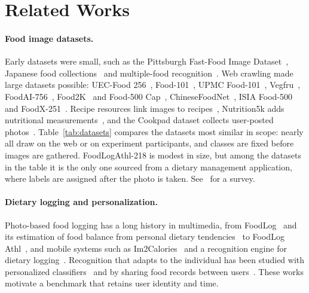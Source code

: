 \documentclass[sigconf, nonacm]{acmart}
\begin{document}
\section{Related Works}
\paragraph{Food image datasets.} Early datasets were small, such as the Pittsburgh Fast-Food Image Dataset~\cite{chen2009pfid}, Japanese food collections~\cite{joutou2009food,hoashi2010image} and multiple-food recognition~\cite{matsuda2012multiple}. Web crawling made large datasets possible: UEC-Food 256~\cite{kawano2015automatic}, Food-101~\cite{bossard2014food}, UPMC Food-101~\cite{wang2015recipe}, Vegfru~\cite{hou2017vegfru}, FoodAI-756~\cite{sahoo2019foodai}, Food2K~\cite{min2023large} and Food-500 Cap~\cite{ma2023food}, ChineseFoodNet~\cite{chen2017chinesefoodnet}, ISIA Food-500~\cite{min2020isia} and FoodX-251~\cite{kaur2019foodx}. Recipe resources link images to recipes~\cite{salvador2017learning,marin2019learning}, Nutrition5k adds nutritional measurements~\cite{thames2021nutrition5k}, and the Cookpad dataset collects user-posted photos~\cite{harashima2017cookpad}. Table~\ref{tab:datasets} compares the datasets most similar in scope: nearly all draw on the web or on experiment participants, and classes are fixed before images are gathered. FoodLogAthl-218 is modest in size, but among the datasets in the table it is the only one sourced from a dietary management application, where labels are assigned after the photo is taken. See~\cite{DBLP:journals/corr/abs-1808-07202} for a survey.

\paragraph{Dietary logging and personalization.} Photo-based food logging has a long history in multimedia, from FoodLog~\cite{aizawa2015foodlog} and its estimation of food balance from personal dietary tendencies~\cite{Aizawa2013FoodBalance} to FoodLog Athl~\cite{nakamoto2022foodlog}, and mobile systems such as Im2Calories~\cite{meyers2015im2calories} and a recognition engine for dietary logging~\cite{merler2016snap}. Recognition that adapts to the individual has been studied with personalized classifiers~\cite{flg469,Horiguchi2018Personalized} and by sharing food records between users~\cite{Kim2021Boosting}. These works motivate a benchmark that retains user identity and time.
\end{document}
